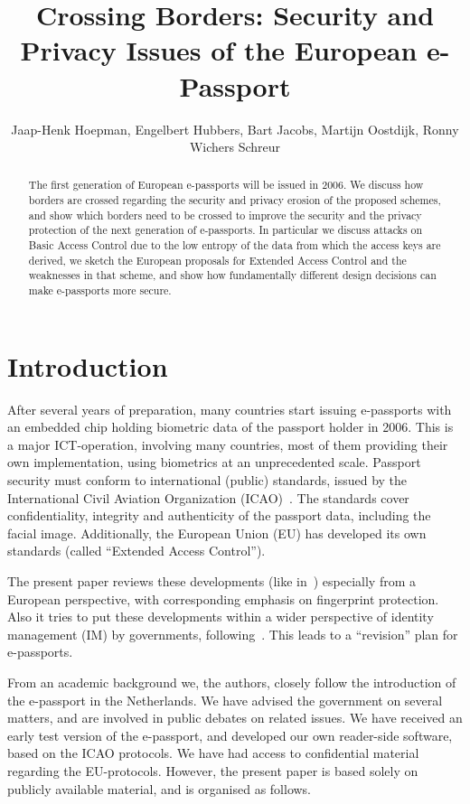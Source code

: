 \documentclass[runningheads,envcountsame,envcountsect,oribibl]{llncs}
\title{Crossing Borders: Security and Privacy Issues of the European 
e-Passport\version{}
}
\author{Jaap-Henk Hoepman,
  Engelbert Hubbers,
  Bart Jacobs,
  Martijn Oostdijk,
  Ronny Wichers Schreur}
\institute{
Institute for Computing and Information Sciences \\
  Radboud University Nijmegen\\
  P.O. Box 9010, 6500 GL \ Nijmegen, 
  the Netherlands \\
  \email{\{jhh,hubbers,bart,martijno,ronny\}@cs.ru.nl}
}
\begin{document}
\maketitle



\begin{abstract}
The first generation of European e-passports will be issued in 2006.  We
discuss how borders are crossed regarding the security and privacy erosion of
the proposed schemes, and show which borders need to be crossed to improve the
security and the privacy protection of the next generation of e-passports.  In
particular we discuss attacks on Basic Access Control due to the low entropy of
the data from which the access keys are derived, we sketch the European
proposals for Extended Access Control and the weaknesses in that scheme, and
show how fundamentally different design decisions can make e-passports
more secure.
\end{abstract}

\section{Introduction} 

After several years of preparation, many countries start
issuing e-pass\-ports with an embedded chip holding biometric data of
the passport holder in 2006. This is a major ICT-operation, involving many
countries, most of them providing their own implementation, using
biometrics at an unprecedented scale. Passport security must
conform to international (public) standards, issued
by the International Civil Aviation Organization
(ICAO)~\cite{icao04:pki,icao04:lds}. The standards cover confidentiality,
integrity and authenticity of the passport data, including the facial
image. Additionally, the European Union (EU) has developed its own
standards (called ``Extended Access Control'').


The present paper reviews these developments (like
in~\cite{juels2005passports,kc2005mrtd}) especially from a European
perspective, with corresponding emphasis on fingerprint protection.
Also it tries to put these developments within a wider perspective of
identity management (IM) by governments,
following~\cite{hoepman2006epassports}. This leads to a ``revision''
plan for e-passports.

From an academic background we, the authors, closely follow the
introduction of the e-passport in the Netherlands.
We have advised
the government on several matters, and are involved in public debates
on related issues. We have received an early test version of
the e-passport, and developed our own reader-side software, based on
the ICAO protocols. We have had access to confidential material
regarding the EU-protocols. However, the present paper is based solely
on publicly available material, and is organised as follows. 
\end{document}
